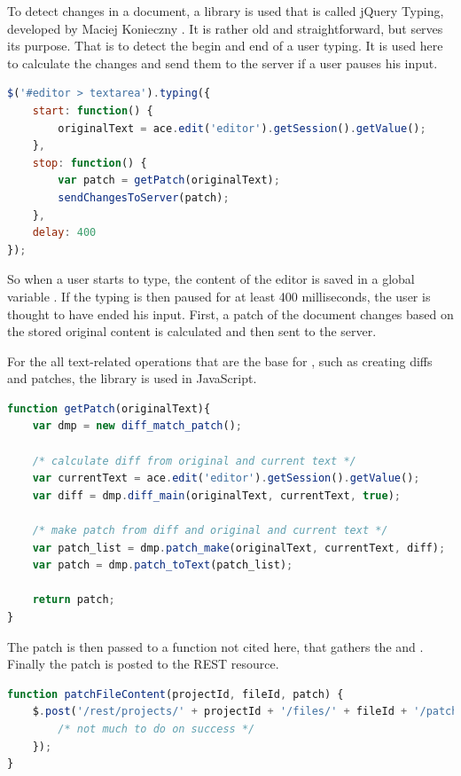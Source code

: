 To detect changes in a document, a library is used that is called jQuery Typing, developed by Maciej Konieczny \cite{website:jquery-typing}. It is rather old and straightforward, but serves its purpose. That is to detect the begin and end of a user typing. It is used here to calculate the changes and send them to the server if a user pauses his input.

\begin{lstlisting}[language=JavaScript, caption=Typing Listener for the Editor]
$('#editor > textarea').typing({
    start: function() {
        originalText = ace.edit('editor').getSession().getValue();
    },
    stop: function() {
        var patch = getPatch(originalText);
        sendChangesToServer(patch);
    },
    delay: 400
});
\end{lstlisting}

So when a user starts to type, the content of the editor is saved in a global variable . If the typing is then paused for at least 400 milliseconds, the user is thought to have ended his input. First, a patch of the document changes based on the stored original content is calculated and then sent to the server.

For the all text-related operations that are the base for , such as creating diffs and patches, the  library is used in JavaScript.

\pagebreak

\begin{lstlisting}[language=JavaScript, caption=Creation of a Diff and subsequently a Patch for the Document's Changes]
function getPatch(originalText){
	var dmp = new diff_match_patch();

	/* calculate diff from original and current text */
	var currentText = ace.edit('editor').getSession().getValue();
	var diff = dmp.diff_main(originalText, currentText, true);

	/* make patch from diff and original and current text */
	var patch_list = dmp.patch_make(originalText, currentText, diff);
	var patch = dmp.patch_toText(patch_list);

	return patch;
}
\end{lstlisting}

The patch is then passed to a function not cited here, that gathers the  and . Finally the patch is posted to the REST resource.

\begin{lstlisting}[language=JavaScript, caption=Posting the Patch to the REST Service]
function patchFileContent(projectId, fileId, patch) {
    $.post('/rest/projects/' + projectId + '/files/' + fileId + '/patch', {patch: patch}, function(data) {
        /* not much to do on success */
    });
}
\end{lstlisting}

